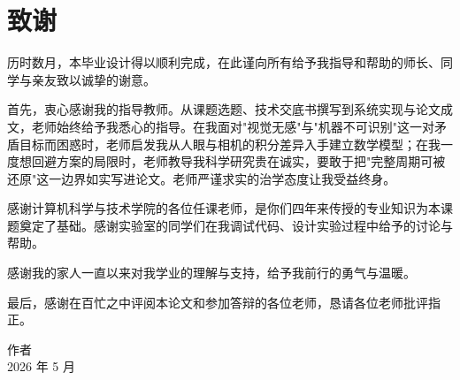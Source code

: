 \chapter*{致\quad 谢}

历时数月，本毕业设计得以顺利完成，在此谨向所有给予我指导和帮助的师长、同学与亲友致以诚挚的谢意。

首先，衷心感谢我的指导教师。从课题选题、技术交底书撰写到系统实现与论文成文，老师始终给予我悉心的指导。在我面对"视觉无感"与"机器不可识别"这一对矛盾目标而困惑时，老师启发我从人眼与相机的积分差异入手建立数学模型；在我一度想回避方案的局限时，老师教导我科学研究贵在诚实，要敢于把"完整周期可被还原"这一边界如实写进论文。老师严谨求实的治学态度让我受益终身。

感谢计算机科学与技术学院的各位任课老师，是你们四年来传授的专业知识为本课题奠定了基础。感谢实验室的同学们在我调试代码、设计实验过程中给予的讨论与帮助。

感谢我的家人一直以来对我学业的理解与支持，给予我前行的勇气与温暖。

最后，感谢在百忙之中评阅本论文和参加答辩的各位老师，恳请各位老师批评指正。

\vspace{10mm}
\hfill 作者\\
\hfill 2026 年 5 月
